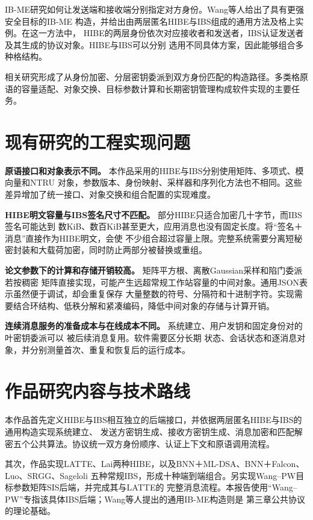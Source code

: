 IB-ME研究如何让发送端和接收端分别指定对方身份。Wang等人给出了具有更强安全目标的IB-ME
构造，并给出由两层匿名HIBE与IBS组成的通用方法及格上实例\cite{wang2024ibme}。在这一方法中，
HIBE的两层身份依次对应接收者和发送者，IBS认证发送者及其生成的协议对象。HIBE与IBS可以分别
选用不同具体方案，因此能够组合多种格结构。

相关研究形成了从身份加密、分层密钥委派到双方身份匹配的构造路径。多类格原语的容量适配、对象交换、目标参数计算和长期密钥管理构成软件实现的主要任务。

\section{现有研究的工程实现问题}

\textbf{原语接口和对象表示不同。} 本作品采用的HIBE与IBS分别使用矩阵、多项式、模向量和NTRU
对象，参数版本、身份映射、采样器和序列化方法也不相同。这些差异增加了统一接口、对象交换和组合配置的实现难度。

\textbf{HIBE明文容量与IBS签名尺寸不匹配。} 部分HIBE只适合加密几十字节，而IBS签名可能达到
数KiB、数百KiB甚至更大，应用消息也没有固定长度。将“签名＋消息”直接作为HIBE明文，会使
不少组合超过容量上限。完整系统需要分离短秘密封装和大载荷加密，同时防止两部分被替换或重组。

\textbf{论文参数下的计算和存储开销较高。} 矩阵平方根、离散Gaussian采样和陷门委派若按稠密
矩阵直接实现，可能产生远超常规工作站容量的中间对象。通用JSON表示虽然便于调试，却会重复保存
大量整数的符号、分隔符和十进制字符。实现需要结合环结构、低秩分解和紧凑编码，降低中间对象的存储与计算开销。

\textbf{连续消息服务的准备成本与在线成本不同。} 系统建立、用户发钥和固定身份对的叶密钥委派可以
被后续消息复用。软件需要区分长期
状态、会话状态和逐消息对象，并分别测量首次、重复和恢复后的运行成本。

\section{作品研究内容与技术路线}

本作品首先定义HIBE与IBS相互独立的后端接口，并依据两层匿名HIBE与IBS的通用构造实现系统建立、
发送方密钥生成、接收方密钥生成、消息加密和匹配解密五个公共算法。协议统一双方身份顺序、认证上下文和原语调用流程。

其次，作品实现LATTE、Lai两种HIBE，以及BNN＋ML-DSA、BNN＋Falcon、Luo、SRGG、Sageloli
五种常规IBS，形成十种端到端组合。另实现Wang--PW目标参数矩阵SIS后端，并完成其与LATTE的
完整消息流程。本报告使用“Wang--PW”专指该具体IBS后端；Wang等人提出的通用IB-ME构造则是
第三章公共协议的理论基础。

